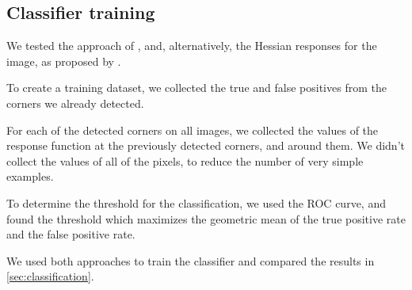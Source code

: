 \subsection{Classifier training}\label{sub:classifier_training}

We tested the approach of \cite{geigerAutomaticCameraRange2012}, and,
alternatively, the Hessian responses for the image, as proposed by
\cite{chenNewSubPixelDetector2005}.

To create a training dataset, we collected the true and false positives from the
corners we already detected.

For each of the detected corners on all images, we collected the values of the
response function at the previously detected corners, and around them.
We didn't collect the values of all of the pixels, to reduce the number
of very simple examples.

To determine the threshold for the classification, we used the ROC curve, and
found the threshold which maximizes
the geometric mean of the true positive rate and the false positive rate.

We used both approaches to train the classifier and compared the
results in \cref{sec:classification}.



